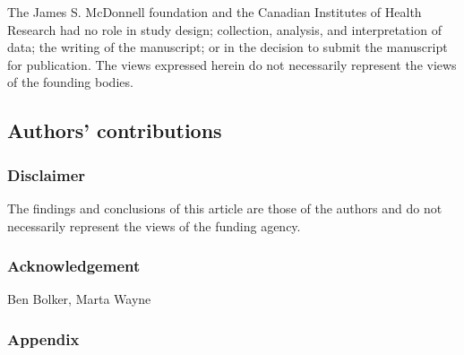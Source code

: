 \documentclass[12pt,]{article}
\begin{document}
The James S. McDonnell foundation and the Canadian Institutes of Health Research had no role in study design; collection, analysis, and interpretation of data; the writing of the manuscript; or in the decision to submit the manuscript for publication.  The views expressed herein do not necessarily represent the views of the founding bodies.

\subsection{Authors' contributions}\label{Authors'-contributions}

\subsubsection{Disclaimer}\label{disclaimer}

The findings and conclusions of this article are those of the authors
and do not necessarily represent the views of the funding agency.

\subsubsection{Acknowledgement}\label{Acknowledgement}
Ben Bolker,  Marta Wayne

\subsubsection{Appendix}\label{appendix-1}


\end{document}
